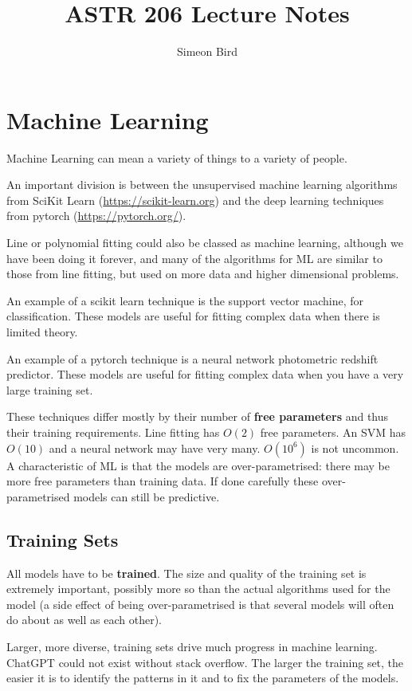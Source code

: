 \documentclass[12pt]{article}
\title{ASTR 206 Lecture Notes}
\author{Simeon Bird}
\begin{document}
\maketitle

\section{Machine Learning}

Machine Learning can mean a variety of things to a variety of people.

An important division is between the unsupervised machine learning algorithms from SciKit Learn (\url{https://scikit-learn.org}) and the deep learning techniques from pytorch (\url{https://pytorch.org/}).

Line or polynomial fitting could also be classed as machine learning, although we have been doing it forever, and many of the algorithms for ML are similar to those from line fitting, but used on more data and higher dimensional problems.

An example of a scikit learn technique is the support vector machine, for classification. These models are useful for fitting complex data when there is limited theory.

An example of a pytorch technique is a neural network photometric redshift predictor. These models are useful for fitting complex data when you have a very large training set.

These techniques differ mostly by their number of \textbf{free parameters} and thus their training requirements. Line fitting has $O(2)$ free parameters. An SVM has $O(10)$ and a neural network may have very many. $O(10^6)$ is not uncommon. A characteristic of ML is that the models are over-parametrised: there may be more free parameters than training data. If done carefully these over-parametrised models can still be predictive.

\subsection{Training Sets}

All models have to be \textbf{trained}. The size and quality of the training set is extremely important, possibly more so than the actual algorithms used for the model (a side effect of being over-parametrised is that several models will often do about as well as each other).

Larger, more diverse, training sets drive much progress in machine learning. ChatGPT could not exist without stack overflow. The larger the training set, the easier it is to identify the patterns in it and to fix the parameters of the models.
\end{document}
